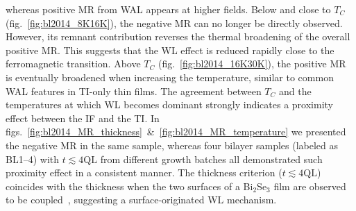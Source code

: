 %
whereas positive MR from WAL appears at higher fields. Below and close to $T_C$ (fig.~\ref{fig:bl2014_8K16K}), the negative MR can no longer be directly observed. However, its remnant contribution reverses the thermal broadening of the overall positive MR. This suggests that the WL effect is reduced rapidly close to the ferromagnetic transition. Above $T_C$ (fig.~\ref{fig:bl2014_16K30K}), the positive MR is eventually broadened when increasing the temperature, similar to common WAL features in TI-only thin films. The agreement between $T_C$ and the temperatures at which WL becomes dominant strongly indicates a proximity effect between the IF and the TI. In figs.~\ref{fig:bl2014_MR_thickness}~\&~\ref{fig:bl2014_MR_temperature} we presented the negative MR in the same sample, whereas four bilayer samples (labeled as BL1--4) with $t\lesssim4\mathrm{QL}$ from different growth batches all demonstrated such proximity effect in a consistent manner. The thickness criterion ($t\lesssim4\mathrm{QL}$) coincides with the thickness when the two surfaces of a Bi$_2$Se$_3$ film are observed to be coupled~\cite{ARPES_thickness}, suggesting a surface-originated WL mechanism.